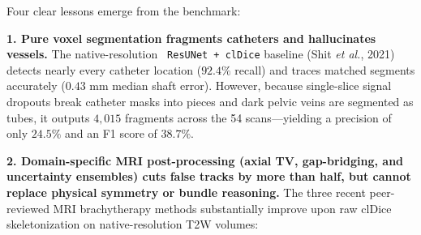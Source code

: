\documentclass[
  11pt,
]{article}
\let\nforigtexttt\texttt
\renewcommand{\texttt}[1]{\nforigtexttt{\XeTeXinterchartokenstate=1 #1}}
\begin{document}
Four clear lessons emerge from the benchmark:

\textbf{1. Pure voxel segmentation fragments catheters and hallucinates
vessels.} The native-resolution \texttt{ResUNet\ +\ clDice} baseline
(Shit \emph{et al.}, 2021) detects nearly every catheter location
(\(92.4\%\) recall) and traces matched segments accurately
(\(0.43\text{ mm}\) median shaft error). However, because single-slice
signal dropouts break catheter masks into pieces and dark pelvic veins
are segmented as tubes, it outputs \(4,015\) fragments across the 54
scans---yielding a precision of only \(24.5\%\) and an F1 score of
\(38.7\%\).

\textbf{2. Domain-specific MRI post-processing (axial TV, gap-bridging,
and uncertainty ensembles) cuts false tracks by more than half, but
cannot replace physical symmetry or bundle reasoning.} The three recent
peer-reviewed MRI brachytherapy methods substantially improve upon raw
clDice skeletonization on native-resolution T2W volumes:
\end{document}
